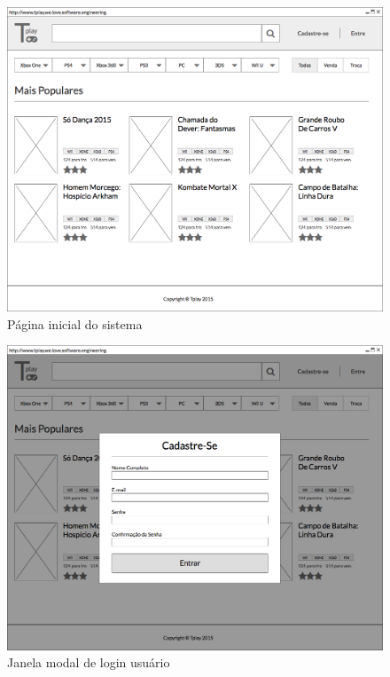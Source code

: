 \documentclass[a4paper,11pt]{article}
\begin{document}
\begin{figure}[!H]
    		\centering
        	\includegraphics[width=\textwidth,height=\dimexpr\textheight-3\baselineskip\relax,keepaspectratio]{Home.png}
        	\caption{Página inicial do sistema}
     		\label{home}
\end{figure}

\begin{figure}[!H]
    		\centering
        	\includegraphics[width=\textwidth,height=\dimexpr\textheight-3\baselineskip\relax,keepaspectratio]{Cadastro.png}
        	\caption{Janela modal de login usuário}
     		\label{cadastro}
\end{figure}
\end{document}
